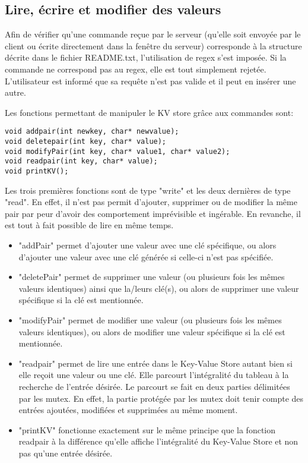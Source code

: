 \documentclass[11pt,a4paper]{article}
\begin{document}
\subsection{Lire, écrire et modifier des valeurs}
Afin de vérifier qu'une commande reçue par le serveur (qu'elle soit envoyée par le client ou écrite directement dans la fenêtre du serveur) corresponde à la structure décrite dans le fichier README.txt, l'utilisation de regex s'est imposée. Si la commande ne correspond pas au regex, elle est tout simplement rejetée. L'utilisateur est informé que sa requête n'est pas valide et il peut en insérer une autre.

Les fonctions permettant de manipuler le KV store grâce aux commandes sont:
\begin{lstlisting}
void addpair(int newkey, char* newvalue);
void deletepair(int key, char* value);
void modifyPair(int key, char* value1, char* value2);
void readpair(int key, char* value);
void printKV();
\end{lstlisting}
Les trois premières fonctions sont de type "write" et les deux dernières de type "read". En effet, il n'est pas permit d'ajouter, supprimer ou de modifier la même pair par peur d'avoir des comportement imprévisible et ingérable. En revanche, il est tout à fait possible de lire en même temps.\\

\begin{itemize}
\item "addPair" permet d'ajouter une valeur avec une clé spécifique, ou alors d'ajouter une valeur avec une clé générée si celle-ci n'est pas spécifiée.
\item "deletePair" permet de supprimer une valeur (ou plusieurs fois les mêmes valeurs identiques) ainsi que la/leurs clé(s), ou alors de supprimer une valeur spécifique si la clé est mentionnée.
\item "modifyPair" permet de modifier une valeur (ou plusieurs fois les mêmes valeurs identiques), ou alors de modifier une valeur spécifique si la clé est mentionnée.
\item "readpair" permet de lire une entrée dans le Key-Value Store autant bien si elle reçoit une valeur ou une clé. Elle parcourt l'intégralité du tableau à la recherche de l'entrée désirée. Le parcourt se fait en deux parties délimitées par les mutex. En effet, la partie protégée par les mutex doit tenir compte des entrées ajoutées, modifiées et supprimées au même moment.
\item "printKV" fonctionne exactement sur le même principe que la fonction readpair à la différence qu'elle affiche l'intégralité du Key-Value Store et non pas qu'une entrée désirée.
\end{itemize}
\end{document}

